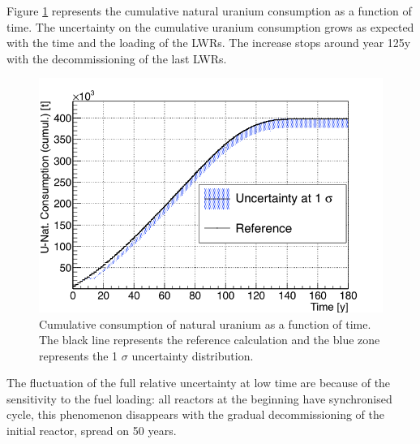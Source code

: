 \documentclass{anstrans}
\begin{document}
Figure \ref{fig:unat_full} represents the cumulative natural uranium
consumption as a function of time. The uncertainty on the cumulative uranium
consumption grows as expected with the time and the loading of the \glspl{LWR}.
The increase stops around year 125y with the decommissioning of the last
\glspl{LWR}.

\begin{figure}[ht] %
    \centering
    \includegraphics[scale=0.35]{unat_full}
    \caption{Cumulative consumption of natural uranium as a function of time. The black line
        represents the reference calculation and the blue zone
        represents the 1 $\sigma$ uncertainty distribution.}\label{fig:unat_full}
\end{figure}


The fluctuation of the full relative uncertainty at low time are because of the
sensitivity to the fuel loading: all reactors at the beginning have synchronised
cycle, this phenomenon disappears with the gradual decommissioning of the initial
reactor, spread on 50 years. 
\end{document}

